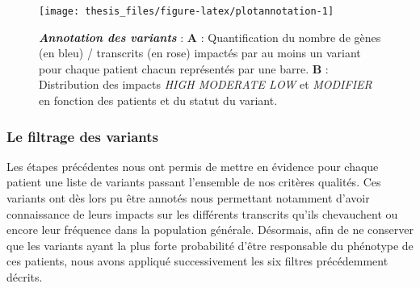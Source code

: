\documentclass[12pt,twoside]{ugathesis}
\begin{document}
\newpage

\begin{figure}

{\centering \texttt{[image: thesis\_files/figure-latex/plotannotation-1]} 

}

\caption[Annotation des variants]{\textbf{\emph{Annotation des variants}} :
\textbf{A} : Quantification du nombre de gènes (en bleu) / transcrits
(en rose) impactés par au moins un variant pour chaque patient chacun
représentés par une barre. \textbf{B} : Distribution des impacts
\emph{HIGH MODERATE LOW} et \emph{MODIFIER} en fonction des patients et
du statut du variant.}\label{fig:plotannotation}
\end{figure}








\subsubsection{Le filtrage des
variants}\label{le-filtrage-des-variants-1}

Les étapes précédentes nous ont permis de mettre en évidence pour chaque
patient une liste de variants passant l'ensemble de nos critères
qualités. Ces variants ont dès lors pu être annotés nous permettant
notamment d'avoir connaissance de leurs impacts sur les différents
transcrits qu'ils chevauchent ou encore leur fréquence dans la
population générale. Désormais, afin de ne conserver que les variants
ayant la plus forte probabilité d'être responsable du phénotype de ces
patients, nous avons appliqué successivement les six filtres
précédemment décrits.
\end{document}
